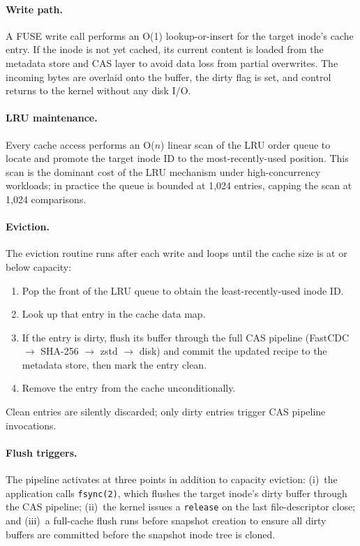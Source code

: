 \documentclass[5p,times]{elsarticle}
\begin{document}
\paragraph{Write path.}
A FUSE write call performs an O(1) lookup-or-insert for the target
inode's cache entry.  If the inode is not yet cached, its current content
is loaded from the metadata store and CAS layer to avoid data loss from
partial overwrites.  The incoming bytes are overlaid onto the buffer,
the dirty flag is set, and control returns to the kernel without any
disk I/O.

\paragraph{LRU maintenance.}
Every cache access performs an O($n$) linear scan of the LRU order queue
to locate and promote the target inode ID to the most-recently-used
position.  This scan is the dominant cost of the LRU mechanism under
high-concurrency workloads; in practice the queue is bounded at 1,024
entries, capping the scan at 1,024 comparisons.

\paragraph{Eviction.}
The eviction routine runs after each write and loops until the cache
size is at or below capacity:
\begin{enumerate}
\item Pop the front of the LRU queue to obtain the least-recently-used
  inode ID.
\item Look up that entry in the cache data map.
\item If the entry is dirty, flush its buffer through the full CAS
  pipeline (FastCDC $\to$ SHA-256 $\to$ zstd $\to$ disk) and commit the
  updated recipe to the metadata store, then mark the entry clean.
\item Remove the entry from the cache unconditionally.
\end{enumerate}
Clean entries are silently discarded; only dirty entries trigger CAS
pipeline invocations.

\paragraph{Flush triggers.}
The pipeline activates at three points in addition to capacity eviction:
(i)~the application calls \texttt{fsync(2)}, which flushes the target
inode's dirty buffer through the CAS pipeline; (ii)~the kernel issues a
\texttt{release} on the last file-descriptor close; and (iii)~a full-cache
flush runs before snapshot creation to ensure all dirty buffers are
committed before the snapshot inode tree is cloned.
\end{document}
